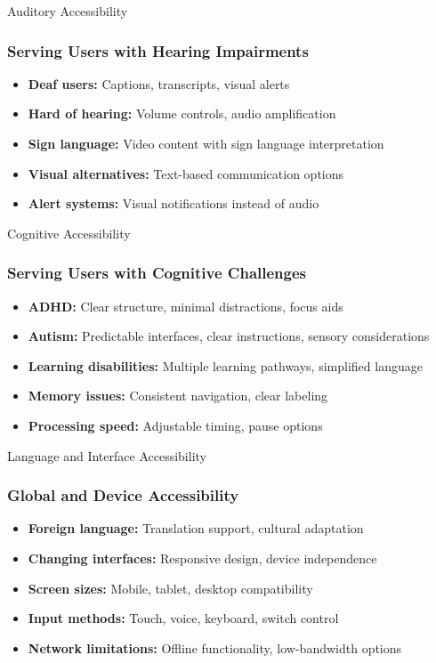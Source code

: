\documentclass[aspectratio=169]{beamer}
\begin{document}
\begin{frame}[fragile]{Auditory Accessibility}
\frametitle{Serving Users with Hearing Impairments}
\begin{itemize}
\item \textbf{Deaf users:} Captions, transcripts, visual alerts
\item \textbf{Hard of hearing:} Volume controls, audio amplification
\item \textbf{Sign language:} Video content with sign language interpretation
\item \textbf{Visual alternatives:} Text-based communication options
\item \textbf{Alert systems:} Visual notifications instead of audio
\end{itemize}
\end{frame}

\begin{frame}[fragile]{Cognitive Accessibility}
\frametitle{Serving Users with Cognitive Challenges}
\begin{itemize}
\item \textbf{ADHD:} Clear structure, minimal distractions, focus aids
\item \textbf{Autism:} Predictable interfaces, clear instructions, sensory considerations
\item \textbf{Learning disabilities:} Multiple learning pathways, simplified language
\item \textbf{Memory issues:} Consistent navigation, clear labeling
\item \textbf{Processing speed:} Adjustable timing, pause options
\end{itemize}
\end{frame}

\begin{frame}[fragile]{Language and Interface Accessibility}
\frametitle{Global and Device Accessibility}
\begin{itemize}
\item \textbf{Foreign language:} Translation support, cultural adaptation
\item \textbf{Changing interfaces:} Responsive design, device independence
\item \textbf{Screen sizes:} Mobile, tablet, desktop compatibility
\item \textbf{Input methods:} Touch, voice, keyboard, switch control
\item \textbf{Network limitations:} Offline functionality, low-bandwidth options
\end{itemize}
\end{frame}
\end{document}
